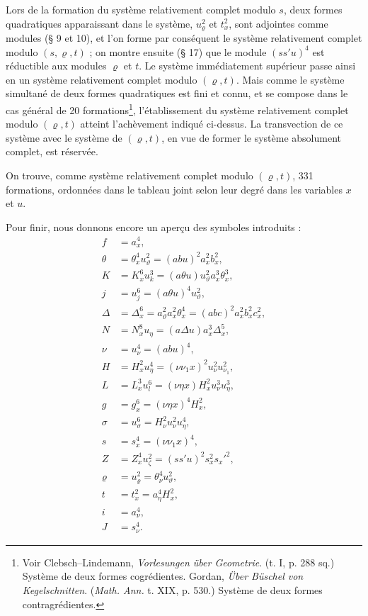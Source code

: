 \documentclass[11pt]{article}
\begin{document}
Lors de la formation du système relativement complet modulo $s$, deux formes quadratiques apparaissant dans le système, $u_\varrho^2$ et $t_x^2$, sont adjointes comme modules (\S{} 9 et 10), et l'on forme par conséquent le système relativement complet modulo $(s,\varrho,t)$ ; on montre ensuite (\S{} 17) que le module $(ss'u)^4$ est réductible aux modules $\varrho$ et $t$. Le système immédiatement supérieur passe ainsi en un système relativement complet modulo $(\varrho,t)$. Mais comme le système simultané de deux formes quadratiques est fini et connu, et se compose dans le cas général de 20 formations\footnote{Voir Clebsch--Lindemann, \emph{Vorlesungen über Geometrie}. (t. I, p. 288 sq.) Système de deux formes cogrédientes. Gordan, \emph{Über Büschel von Kegelschnitten}. (\emph{Math. Ann.} t. XIX, p. 530.) Système de deux formes contragrédientes.}, l'établissement du système relativement complet modulo $(\varrho,t)$ atteint l'achèvement indiqué ci-dessus. La transvection de ce système avec le système de $(\varrho,t)$, en vue de former le système absolument complet, est réservée.

On trouve, comme système relativement complet modulo $(\varrho,t)$, 331 formations, ordonnées dans le tableau joint selon leur degré dans les variables $x$ et $u$.

Pour finir, nous donnons encore un aperçu des symboles introduits :
\begin{align*}
f&=a_x^4,\\
\theta&=\theta_x^4u_\vartheta^2=(abu)^2a_x^2b_x^2,\\
K&=K_x^6u_k^3=(a\theta u)u_\vartheta^2a_x^3\theta_x^3,\\
j&=u_j^6=(a\theta u)^4u_\vartheta^2,\\
\Delta&=\Delta_x^6=a_\vartheta^2a_x^2\theta_x^4=(abc)^2a_x^2b_x^2c_x^2,\\
N&=N_x^8u_\eta=(a\Delta u)a_x^3\Delta_x^5,\\
\nu&=u_\nu^4=(abu)^4,\\
H&=H_x^2u_\eta^4=(\nu\nu_1x)^2u_\nu^2u_{\nu_1}^2,\\
L&=L_x^3u_l^6=(\nu\eta x)H_x^2u_\nu^3u_\eta^3,\\
g&=g_x^6=(\nu\eta x)^4H_x^2,\\
\sigma&=u_\sigma^6=H_\nu^2u_\nu^2u_\eta^4,\\
s&=s_x^4=(\nu\nu_1x)^4,\\
Z&=Z_x^4u_\zeta^2=(ss'u)^2s_x^2s_x'^2,\\
\varrho&=u_\varrho^2=\theta_\nu^4u_\vartheta^2,\\
t&=t_x^2=a_\eta^4H_x^2,\\
i&=a_\nu^4,\\
J&=s_\nu^4.
\end{align*}
\end{document}
